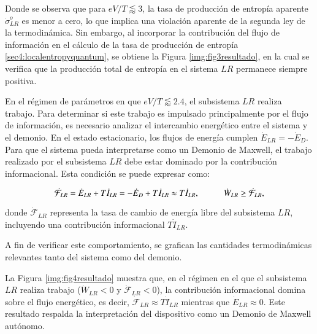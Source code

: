 
Donde se observa que para $eV/T \lessapprox 3$, la tasa de producción de entropía aparente $\dot{\sigma}^{o}_{LR}$ es menor a cero, lo que implica una violación aparente de la segunda ley de la termodinámica. Sin embargo, al incorporar la contribución del flujo de información en el cálculo de la tasa de producción de entropía \ref{sec4:localentropyquantum}, se obtiene la Figura \ref{img:fig3resultado}, en la cual se verifica que la producción total de entropía en el sistema $LR$ permanece siempre positiva.


En el régimen de parámetros en que \( eV/T \lessapprox 2.4 \), el subsistema \( LR \) realiza trabajo. Para determinar si este trabajo es impulsado principalmente por el flujo de información, es necesario analizar el intercambio energético entre el sistema y el demonio. En el estado estacionario, los flujos de energía cumplen $\dot{E}_{LR}= -\dot{E}_{D}$. Para que el sistema pueda interpretarse como un Demonio de Maxwell, el trabajo realizado por el subsistema \( LR \) debe estar dominado por la contribución informacional. Esta condición se puede expresar como:

\[
\dot{\mathcal{F}}_{LR} = \dot{E}_{LR} + T\dot{I}_{LR} = -\dot{E}_{D} + T\dot{I}_{LR} \approx T\dot{I}_{LR}, \hspace{10mm} \dot{W}_{LR} \geq \dot{\mathcal{F}}_{LR},
\]

donde \( \dot{\mathcal{F}}_{LR} \) representa la tasa de cambio de energía libre del subsistema \( LR \), incluyendo una contribución informacional \( T\dot{I}_{LR} \).

A fin de verificar este comportamiento, se grafican las cantidades termodinámicas relevantes tanto del sistema como del demonio.



La Figura \ref{img:fig4resultado} muestra que, en el régimen en el que el subsistema $LR$ realiza trabajo ($\dot{W}_{LR} < 0$ y $\dot{\mathcal{F}}_{LR} < 0$), la contribución informacional domina sobre el flujo energético, es decir, $\dot{\mathcal{F}}_{LR} \approx T \dot{I}_{LR}$ mientras que $\dot{E}_{LR} \approx 0$. Este resultado respalda la interpretación del dispositivo como un Demonio de Maxwell autónomo.

